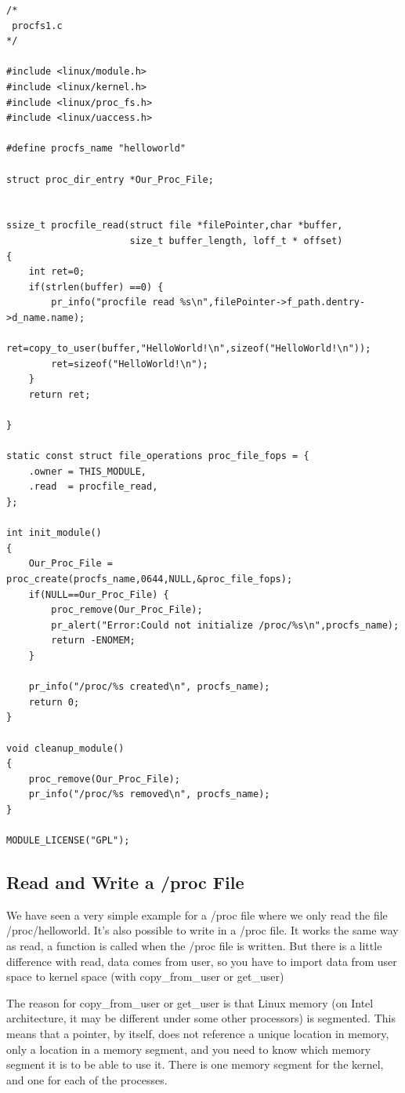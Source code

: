 \documentclass[11pt]{article}
\begin{document}
\begin{verbatim}
/*
 procfs1.c
*/

#include <linux/module.h>
#include <linux/kernel.h>
#include <linux/proc_fs.h>
#include <linux/uaccess.h>

#define procfs_name "helloworld"

struct proc_dir_entry *Our_Proc_File;


ssize_t procfile_read(struct file *filePointer,char *buffer,
                      size_t buffer_length, loff_t * offset)
{
    int ret=0;
    if(strlen(buffer) ==0) {
        pr_info("procfile read %s\n",filePointer->f_path.dentry->d_name.name);
        ret=copy_to_user(buffer,"HelloWorld!\n",sizeof("HelloWorld!\n"));
        ret=sizeof("HelloWorld!\n");
    }
    return ret;

}

static const struct file_operations proc_file_fops = {
    .owner = THIS_MODULE,
    .read  = procfile_read,
};

int init_module()
{
    Our_Proc_File = proc_create(procfs_name,0644,NULL,&proc_file_fops);
    if(NULL==Our_Proc_File) {
        proc_remove(Our_Proc_File);
        pr_alert("Error:Could not initialize /proc/%s\n",procfs_name);
        return -ENOMEM;
    }

    pr_info("/proc/%s created\n", procfs_name);
    return 0;
}

void cleanup_module()
{
    proc_remove(Our_Proc_File);
    pr_info("/proc/%s removed\n", procfs_name);
}

MODULE_LICENSE("GPL");
\end{verbatim}

\subsection*{Read and Write a /proc File}
\label{sec-7-1}
We have seen a very simple example for a /proc file where we only read the file /proc/helloworld. It's also possible to write in a /proc file. It works the same way as read, a function is called when the /proc file is written. But there is a little difference with read, data comes from user, so you have to import data from user space to kernel space (with copy\_from\_user or get\_user)

The reason for copy\_from\_user or get\_user is that Linux memory (on Intel architecture, it may be different under some other processors) is segmented. This means that a pointer, by itself, does not reference a unique location in memory, only a location in a memory segment, and you need to know which memory segment it is to be able to use it. There is one memory segment for the kernel, and one for each of the processes.
\end{document}
